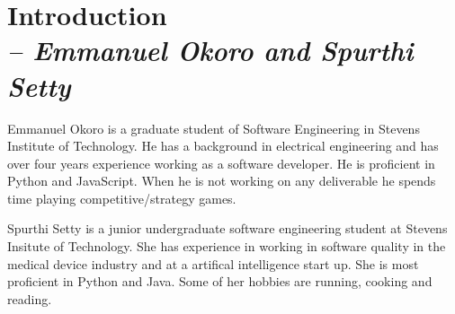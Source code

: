 \chapter{Introduction \\
\small{\textit{-- Emmanuel Okoro and Spurthi Setty}}
\label{Chapter::Introduction}}

Emmanuel Okoro is a graduate student of Software Engineering in Stevens Institute of Technology. He has a background in electrical engineering and has over four years experience working as a software developer. He is proficient in Python and JavaScript. When he is not working on any deliverable he spends time playing competitive/strategy games.

Spurthi Setty is a junior undergraduate software engineering student at Stevens Insitute of Technology. She has experience in working in software quality in the medical device industry and at a artifical intelligence start up. She is most proficient in Python and Java. Some of her hobbies are running, cooking and reading.
